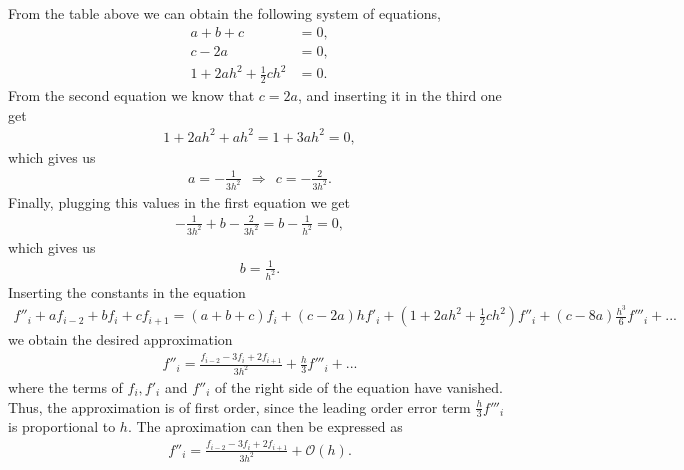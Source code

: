 \begin{solution}
From the table above we can obtain the following system of equations,
\begin{align*}
a+b+c&=0,\\
c-2a&=0,\\
1+2ah^2+\frac{1}{2}ch^2&=0.
\end{align*}
From the second equation we know that $c=2a$, and inserting it in the third one get
\begin{align*}
1+2ah^2+ah^2=1+3ah^2=0,
\end{align*}
which gives us 
\begin{align*}
a=-\frac{1}{3h^2}~~\Rightarrow~~c=-\frac{2}{3h^2}.
\end{align*}
Finally, plugging this values in the first equation we get
\begin{align*}
-\frac{1}{3h^2}+b-\frac{2}{3h^2}=b-\frac{1}{h^2}=0,
\end{align*}
which gives us 
\begin{align*}
b=\frac{1}{h^2}.
\end{align*}
Inserting the constants in the equation
\begin{align*}
f''_i+af_{i-2}+bf_i+cf_{i+1}=(a+b+c)f_i+(c-2a)hf'_i+(1+2ah^2+\frac{1}{2}ch^2)f''_i+(c-8a)\frac{h^3}{6}f'''_i+...
\end{align*}
we obtain the desired approximation
\begin{align*}
f''_i=\frac{f_{i-2}-3f_i+2f_{i+1}}{3h^2}+\frac{h}{3}f'''_i+...
\end{align*}
where the terms of $f_i,f'_i$ and $f''_i$ of the right side of the equation have vanished. Thus, the approximation is of first order, since the leading order error term $\frac{h}{3}f'''_i$ is proportional to $h$. The aproximation can then be expressed as
\begin{align*}
f''_i=\frac{f_{i-2}-3f_i+2f_{i+1}}{3h^2}+\mathcal{O}(h).
\end{align*}
\end{solution}